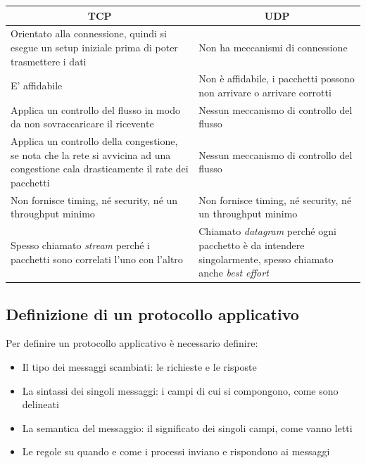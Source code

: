 \begin{table}[H]
    \centering
    \begin{tabular}{p{150px}|p{150px}}
        \multicolumn{1}{c}{\textbf{TCP}} & 
        \multicolumn{1}{c}{\textbf{UDP}}\\
        \hline        
        Orientato alla connessione, quindi si esegue un setup iniziale prima di poter trasmettere i dati &
        Non ha meccanismi di connessione \\
        \hline
        E' affidabile & 
        Non è affidabile, i pacchetti possono non arrivare o arrivare corrotti\\
        \hline
        Applica un controllo del flusso in modo da non sovraccaricare il ricevente &
        Nessun meccanismo di controllo del flusso \\       
        \hline
        Applica un controllo della congestione, se nota che la rete si avvicina ad una congestione cala drasticamente il  rate dei pacchetti & 
        Nessun meccanismo di controllo del flusso \\
        \hline
        Non fornisce timing, né security, né un throughput minimo &
        Non fornisce timing, né security, né un throughput minimo \\
        \hline
        Spesso chiamato \emph{stream} perché i pacchetti sono correlati l'uno con l'altro &
        Chiamato \emph{datagram} perché ogni pacchetto è da intendere singolarmente, spesso chiamato anche \emph{best effort} \\
    \end{tabular}
\end{table}

\subsection{Definizione di un protocollo applicativo}
Per definire un protocollo applicativo è necessario definire:
\begin{itemize}
    \item Il tipo dei messaggi scambiati: le richieste e le risposte
    \item La sintassi dei singoli messaggi: i campi di cui si compongono, come sono delineati
    \item La semantica del messaggio: il significato dei singoli campi, come vanno letti
    \item Le regole su quando e come i processi inviano e rispondono ai messaggi
\end{itemize}

